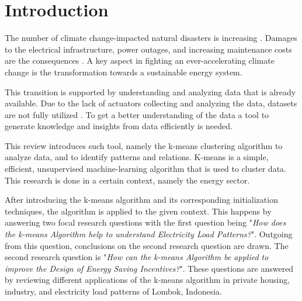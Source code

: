 \section{Introduction}
\label{cha:introduction}


The number of climate change-impacted natural disasters is increasing \cite{JES-IND}.
Damages to the electrical infrastructure, power outages, and increasing maintenance costs are the consequences \cite{FAN-CCI}.
A key aspect in fighting an ever-accelerating climate change is the transformation towards a sustainable energy system.

This transition is supported by understanding and analyzing data that is already available.
Due to the lack of actuators collecting and analyzing the data, datasets are not fully utilized \cite{LIU-BDE}.
To get a better understanding of the data a tool to generate knowledge and insights from data efficiently is needed.

This review introduces such tool, namely the k-means clustering algorithm to analyze data, and to identify patterns and relations.
K-means is a simple, efficient, unsupervised machine-learning algorithm that is used to cluster data.
This research is done in a certain context, namely the energy sector.

After introducing the k-means algorithm and its corresponding initialization techniques, the algorithm is applied to the given context.
This happens by answering two focal research questions with the first question being "\textit{How does the k-means Algorithm help to understand Electricity Load Patterns?}".
Outgoing from this question, conclusions on the second research question are drawn.
The second research question is "\textit{How can the k-means Algorithm be applied to improve the Design of Energy Saving Incentives?}".
These questions are answered by reviewing different applications of the k-means algorithm in private housing, industry, and electricity load patterns of Lombok, Indonesia.

